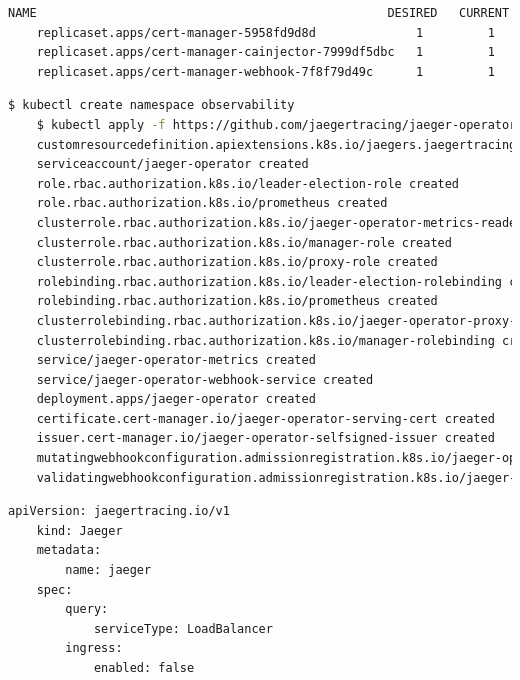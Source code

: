\documentclass[14pt,a4paper]{report}
\begin{document}
{\begin{lstlisting}[language=Bash]
	NAME                                                 DESIRED   CURRENT   READY   AGE
	replicaset.apps/cert-manager-5958fd9d8d              1         1         1       2d22h
	replicaset.apps/cert-manager-cainjector-7999df5dbc   1         1         1       2d22h
	replicaset.apps/cert-manager-webhook-7f8f79d49c      1         1         1       2d22h
	\end{lstlisting}
	\hspace{1.0cm}{Tiếp theo đấy, chúng ta bắt đầu triển khai Jaeger. Để triển khai Jaeger, chúng ta cần chạy câu lệnh sau:}
	\begin{lstlisting}[language=Bash]
	$ kubectl create namespace observability
	$ kubectl apply -f https://github.com/jaegertracing/jaeger-operator/releases/download/v1.40.0/jaeger-operator.yaml
	customresourcedefinition.apiextensions.k8s.io/jaegers.jaegertracing.io created
	serviceaccount/jaeger-operator created
	role.rbac.authorization.k8s.io/leader-election-role created
	role.rbac.authorization.k8s.io/prometheus created
	clusterrole.rbac.authorization.k8s.io/jaeger-operator-metrics-reader created
	clusterrole.rbac.authorization.k8s.io/manager-role created
	clusterrole.rbac.authorization.k8s.io/proxy-role created
	rolebinding.rbac.authorization.k8s.io/leader-election-rolebinding created
	rolebinding.rbac.authorization.k8s.io/prometheus created
	clusterrolebinding.rbac.authorization.k8s.io/jaeger-operator-proxy-rolebinding created
	clusterrolebinding.rbac.authorization.k8s.io/manager-rolebinding created
	service/jaeger-operator-metrics created
	service/jaeger-operator-webhook-service created
	deployment.apps/jaeger-operator created
	certificate.cert-manager.io/jaeger-operator-serving-cert created
	issuer.cert-manager.io/jaeger-operator-selfsigned-issuer created
	mutatingwebhookconfiguration.admissionregistration.k8s.io/jaeger-operator-mutating-webhook-configuration created
	validatingwebhookconfiguration.admissionregistration.k8s.io/jaeger-operator-validating-webhook-configuration created
	\end{lstlisting}
	\hspace{1.0cm}{Tiếp theo, chúng ta sẽ tạo 1 tệp tin để tạo 1 ứng dụng Jaeger, pod loại Jaeger, ứng dụng này sẽ thu thập dữ liệu được gửi lên từ ứng dụng frontend và backend. Nội dung của tệp tin như sau:}
	\begin{lstlisting}[language=Bash]
	apiVersion: jaegertracing.io/v1
	kind: Jaeger
	metadata:
		name: jaeger
	spec:
		query:
			serviceType: LoadBalancer
		ingress:
			enabled: false
	\end{lstlisting}
}
\end{document}
